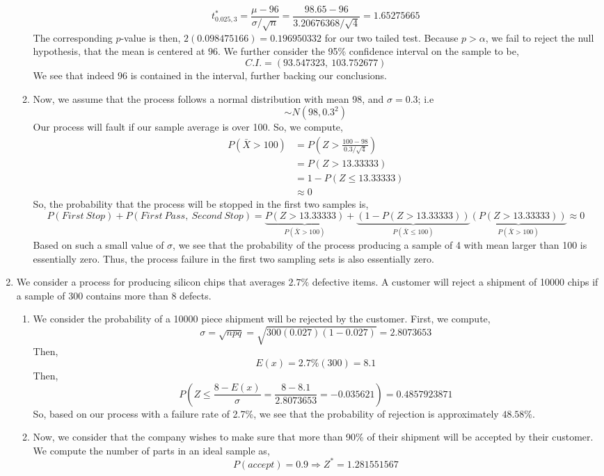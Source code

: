\documentclass[letterpaper,10pt]{article}
\begin{document}
\begin{enumerate}
\begin{enumerate}
\[t^*_{0.025,3}=\frac{\mu-96}{\sigma/\sqrt{n}}=\frac{98.65-96}{3.20676368/\sqrt{4}}=1.65275665\]
The corresponding $p$-value is then, $2(0.098475166)=0.196950332$ for our two tailed test. Because $p>\alpha$, we fail to reject the null hypothesis, that the mean is centered at $96$. We further consider the 95\% confidence interval on the sample to be,
\[C.I.=(93.547323,\ 103.752677)\]
We see that indeed $96$ is contained in the interval, further backing our conclusions.
\item Now, we assume that the process follows a normal distribution with mean 98, and $\sigma=0.3$; i.e $$\sim N(98,0.3^2)$$ Our process will fault if our sample average is over 100. So, we compute,
\begin{align*}
P(\bar{X}>100) &= P(Z>\frac{100-98}{0.3/\sqrt{4}})\\
&=P(Z>13.33333)\\
&=1-P(Z\leq 13.33333)\\
&\approx 0
\end{align*}
So, the probability that the process will be stopped in the first two samples is,
\[P(First\ Stop)+P(First\ Pass,\ Second\ Stop)=\underbrace{P(Z>13.33333)}_{P(\bar{X}>100)}+\underbrace{(1-P(Z>13.33333))}_{P(\bar{X}\leq 100)}\underbrace{(P(Z>13.33333))}_{P(\bar{X}>100)}\approx 0\]
Based on such a small value of $\sigma$, we see that the probability of the process producing a sample of 4 with mean larger than 100 is essentially zero. Thus, the process failure in the first two sampling sets is also essentially zero.
\end{enumerate}
\item We consider a process for producing silicon chips that averages $2.7\%$ defective items. A customer will reject a shipment of 10000 chips if a sample of 300 contains more than 8 defects.
\begin{enumerate}
\item We consider the probability of a 10000 piece shipment will be rejected by the customer. First, we compute,
\[\sigma=\sqrt{npq}=\sqrt{300(0.027)(1-0.027)}=2.8073653\]
Then,
\[E(x)=2.7\%(300)=8.1\]
Then,
\[P(Z\leq \frac{8-E(x)}{\sigma}=\frac{8-8.1}{2.8073653}=-0.035621)=0.4857923871\]
So, based on our process with a failure rate of 2.7\%, we see that the probability of rejection is approximately $48.58\%$.
\item Now, we consider that the company wishes to make sure that more than 90\% of their shipment will be accepted by their customer. We compute the number of parts in an ideal sample as,
\[P(accept)=0.9\Rightarrow Z^*=1.281551567\]

\end{enumerate}
\end{enumerate}
\end{document}
